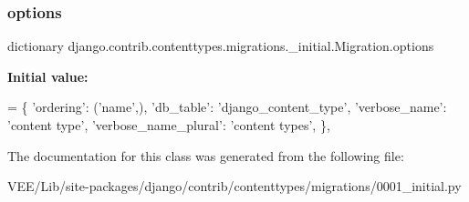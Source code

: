 \subsubsection{\texorpdfstring{options}{options}}
{\footnotesize\ttfamily dictionary django.\+contrib.\+contenttypes.\+migrations.\+\_\+initial.\+Migration.\+options\hspace{0.3cm}{\ttfamily [static]}}

{\bfseries Initial value\+:}
\begin{DoxyCode}
= \{
                \textcolor{stringliteral}{'ordering'}: (\textcolor{stringliteral}{'name'},),
                \textcolor{stringliteral}{'db\_table'}: \textcolor{stringliteral}{'django\_content\_type'},
                \textcolor{stringliteral}{'verbose\_name'}: \textcolor{stringliteral}{'content type'},
                \textcolor{stringliteral}{'verbose\_name\_plural'}: \textcolor{stringliteral}{'content types'},
            \},
\end{DoxyCode}


The documentation for this class was generated from the following file\+:\begin{DoxyCompactItemize}
\item 
V\+E\+E/\+Lib/site-\/packages/django/contrib/contenttypes/migrations/0001\+\_\+initial.\+py\end{DoxyCompactItemize}
